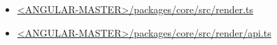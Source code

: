 

\begin{itemize}
  \item \href{https://github.com/angular/angular/blob/master/packages/core/src/render.ts}
        {<ANGULAR-MASTER>/packages/core/src/render.ts}
\end{itemize}






\begin{itemize}
  \item \href{https://github.com/angular/angular/blob/master/packages/core/src/render/api.ts}
        {<ANGULAR-MASTER>/packages/core/src/render/api.ts}
\end{itemize}





